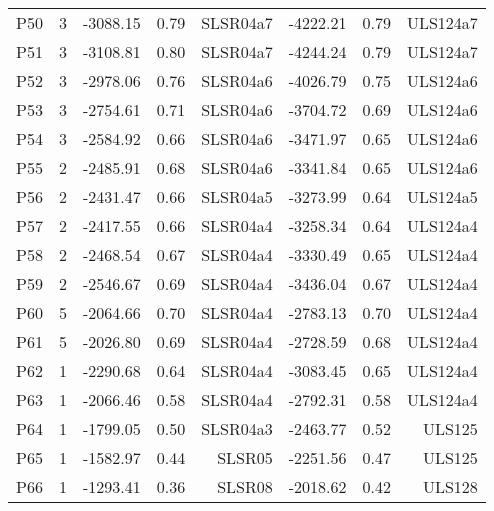 \begin{center}
\begin{supertabular}{|c|c|rrr|rrr|}
P50 & 3 & -3088.15 & 0.79 & SLSR04a7 & -4222.21 & 0.79 & ULS124a7\\
P51 & 3 & -3108.81 & 0.80 & SLSR04a7 & -4244.24 & 0.79 & ULS124a7\\
P52 & 3 & -2978.06 & 0.76 & SLSR04a6 & -4026.79 & 0.75 & ULS124a6\\
P53 & 3 & -2754.61 & 0.71 & SLSR04a6 & -3704.72 & 0.69 & ULS124a6\\
P54 & 3 & -2584.92 & 0.66 & SLSR04a6 & -3471.97 & 0.65 & ULS124a6\\
P55 & 2 & -2485.91 & 0.68 & SLSR04a6 & -3341.84 & 0.65 & ULS124a6\\
P56 & 2 & -2431.47 & 0.66 & SLSR04a5 & -3273.99 & 0.64 & ULS124a5\\
P57 & 2 & -2417.55 & 0.66 & SLSR04a4 & -3258.34 & 0.64 & ULS124a4\\
P58 & 2 & -2468.54 & 0.67 & SLSR04a4 & -3330.49 & 0.65 & ULS124a4\\
P59 & 2 & -2546.67 & 0.69 & SLSR04a4 & -3436.04 & 0.67 & ULS124a4\\
P60 & 5 & -2064.66 & 0.70 & SLSR04a4 & -2783.13 & 0.70 & ULS124a4\\
P61 & 5 & -2026.80 & 0.69 & SLSR04a4 & -2728.59 & 0.68 & ULS124a4\\
P62 & 1 & -2290.68 & 0.64 & SLSR04a4 & -3083.45 & 0.65 & ULS124a4\\
P63 & 1 & -2066.46 & 0.58 & SLSR04a4 & -2792.31 & 0.58 & ULS124a4\\
P64 & 1 & -1799.05 & 0.50 & SLSR04a3 & -2463.77 & 0.52 & ULS125\\
P65 & 1 & -1582.97 & 0.44 & SLSR05 & -2251.56 & 0.47 & ULS125\\
P66 & 1 & -1293.41 & 0.36 & SLSR08 & -2018.62 & 0.42 & ULS128\\

\end{supertabular}
\end{center}
